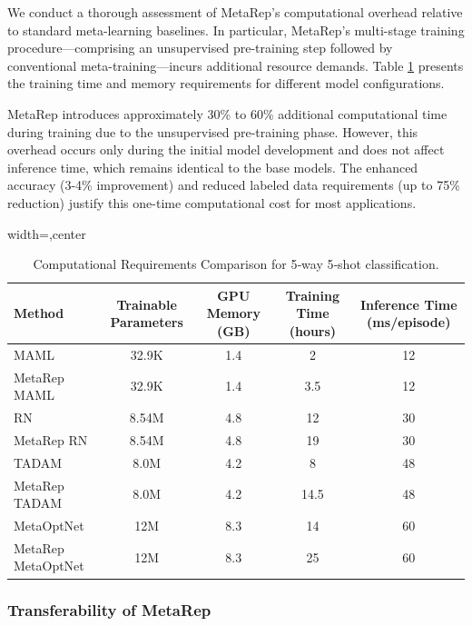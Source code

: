 We conduct a thorough assessment of MetaRep’s computational overhead relative to standard meta-learning baselines. In particular, MetaRep’s multi-stage training procedure—comprising an unsupervised pre-training step followed by conventional meta-training—incurs additional resource demands. Table \ref{tab:computational_requirements} presents the training time and memory requirements for different model configurations.

MetaRep introduces approximately 30\% to 60\% additional computational time during training due to the unsupervised pre-training phase. However, this overhead occurs only during the initial model development and does not affect inference time, which remains identical to the base models. The enhanced accuracy (3-4\% improvement) and reduced labeled data requirements (up to 75\% reduction) justify this one-time computational cost for most applications.

\begin{table}[htbp]
  \centering
  \caption{Computational Requirements Comparison for 5‐way 5‐shot classification.}
  \label{tab:computational_requirements}
  \begin{adjustbox}{width=\linewidth,center}
  \begin{tabular}{lcccc}
      \toprule
      \textbf{Method} & \textbf{Trainable Parameters} & \textbf{GPU Memory (GB)} & \textbf{Training Time (hours)} & \textbf{Inference Time (ms/episode)} \\
      \midrule
      MAML         &  32.9K & 1.4  & 2 & 12 \\
      MetaRep MAML &  32.9K  & 1.4 & 3.5 & 12 \\
      RN           &  8.54M  &  4.8  & 12 & 30 \\
      MetaRep RN   &  8.54M  & 4.8 & 19 & 30 \\
      TADAM        &   8.0M & 4.2 &  8 &  48 \\
      MetaRep TADAM    & 8.0M & 4.2 &  14.5 &  48 \\
      MetaOptNet   &  12M &  8.3 &  14 &  60 \\
      MetaRep MetaOptNet & 12M & 8.3 &  25 &  60 \\
      \bottomrule
  \end{tabular}
\end{adjustbox}
\end{table}

\subsubsection{Transferability of MetaRep}

